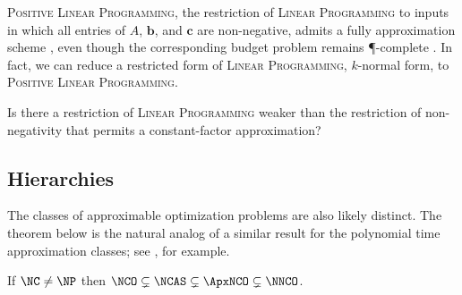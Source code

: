 \documentclass[]{article}
\begin{document}
\textsc{Positive Linear Programming}, the restriction of \textsc{Linear Programming} to inputs in which all entries of $A$, $\mathbf{b}$, and $\mathbf{c}$ are non-negative, admits a fully \NC{} approximation scheme \cite{ln93}, even though the corresponding budget problem remains \P-complete \cite{tx98}.
In fact, we can reduce a restricted form of \textsc{Linear Programming}, $k$-normal form, to \textsc{Positive Linear Programming}. \cite{trevisan00}
\begin{openquestion}
  Is there a restriction of \textsc{Linear Programming} weaker than the restriction of non-negativity that permits a constant-factor \NC{} approximation?
\end{openquestion}

\subsection{Hierarchies}

The classes of approximable optimization problems are also likely distinct.
The theorem below is the natural analog of a similar result for the polynomial time approximation classes; see \cite[Exercise~8.1]{acgkmp99}, for example.

\begin{theorem}\label{thm:hierarchy}
  If $\NC \neq \NP$ then $\NCO \subsetneq \NCAS \subsetneq \ApxNCO \subsetneq \NNCO$.
\end{theorem}
\end{document}
